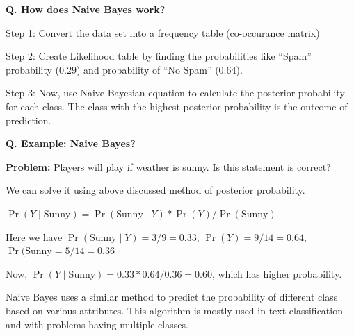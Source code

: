 \begin{frame}[fragile]{\textbf{Q. How does Naive Bayes work?}}
  \begin{wideitemize}
  \item Step 1: Convert the data set into a frequency table (co-occurance matrix)
  \item Step 2: Create Likelihood table by finding the probabilities like
    ``Spam'' probability ($0.29$) and probability of ``No Spam'' ($0.64$).
  \item Step 3: Now, use Naive Bayesian equation to calculate the posterior
    probability for each class. The class with the highest posterior probability
    is the outcome of prediction.
  \end{wideitemize}
\end{frame}

\begin{frame}[fragile]{\textbf{Q. Example: Naive Bayes?}}
  \begin{wideitemize}
  \item \textbf{Problem:} Players will play if weather is sunny. Is this statement is correct?\medskip
    \begin{wideitemize}
    \item We can solve it using above discussed method of posterior probability.
    \item $\Pr( Y \mid \text{Sunny} ) = \Pr( \text{Sunny} \mid Y ) * \Pr( Y ) /
      \Pr( \text{Sunny} )$
    \item Here we have $\Pr( \text{Sunny} \mid Y ) = 3/9 = 0.33$, $\Pr( Y ) =
      9/14 = 0.64$, $\Pr( \text{Sunny} = 5/14 = 0.36$
    \item Now, $\Pr( Y \mid \text{Sunny} ) = 0.33 * 0.64 / 0.36 = 0.60$, which
      has higher probability.
    \end{wideitemize}
  \item Naive Bayes uses a similar method to predict the probability of
    different class based on various attributes. This algorithm is mostly used
    in text classification and with problems having multiple classes.
  \end{wideitemize}
\end{frame}



